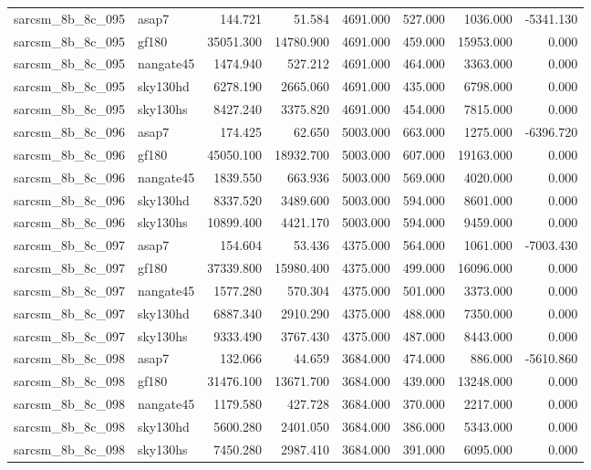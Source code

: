 \begin{tabular}{llrrrrrr}
sarcsm\_8b\_8c\_095 & asap7 & 144.721 & 51.584 & 4691.000 & 527.000 & 1036.000 & -5341.130 \\
sarcsm\_8b\_8c\_095 & gf180 & 35051.300 & 14780.900 & 4691.000 & 459.000 & 15953.000 & 0.000 \\
sarcsm\_8b\_8c\_095 & nangate45 & 1474.940 & 527.212 & 4691.000 & 464.000 & 3363.000 & 0.000 \\
sarcsm\_8b\_8c\_095 & sky130hd & 6278.190 & 2665.060 & 4691.000 & 435.000 & 6798.000 & 0.000 \\
sarcsm\_8b\_8c\_095 & sky130hs & 8427.240 & 3375.820 & 4691.000 & 454.000 & 7815.000 & 0.000 \\
sarcsm\_8b\_8c\_096 & asap7 & 174.425 & 62.650 & 5003.000 & 663.000 & 1275.000 & -6396.720 \\
sarcsm\_8b\_8c\_096 & gf180 & 45050.100 & 18932.700 & 5003.000 & 607.000 & 19163.000 & 0.000 \\
sarcsm\_8b\_8c\_096 & nangate45 & 1839.550 & 663.936 & 5003.000 & 569.000 & 4020.000 & 0.000 \\
sarcsm\_8b\_8c\_096 & sky130hd & 8337.520 & 3489.600 & 5003.000 & 594.000 & 8601.000 & 0.000 \\
sarcsm\_8b\_8c\_096 & sky130hs & 10899.400 & 4421.170 & 5003.000 & 594.000 & 9459.000 & 0.000 \\
sarcsm\_8b\_8c\_097 & asap7 & 154.604 & 53.436 & 4375.000 & 564.000 & 1061.000 & -7003.430 \\
sarcsm\_8b\_8c\_097 & gf180 & 37339.800 & 15980.400 & 4375.000 & 499.000 & 16096.000 & 0.000 \\
sarcsm\_8b\_8c\_097 & nangate45 & 1577.280 & 570.304 & 4375.000 & 501.000 & 3373.000 & 0.000 \\
sarcsm\_8b\_8c\_097 & sky130hd & 6887.340 & 2910.290 & 4375.000 & 488.000 & 7350.000 & 0.000 \\
sarcsm\_8b\_8c\_097 & sky130hs & 9333.490 & 3767.430 & 4375.000 & 487.000 & 8443.000 & 0.000 \\
sarcsm\_8b\_8c\_098 & asap7 & 132.066 & 44.659 & 3684.000 & 474.000 & 886.000 & -5610.860 \\
sarcsm\_8b\_8c\_098 & gf180 & 31476.100 & 13671.700 & 3684.000 & 439.000 & 13248.000 & 0.000 \\
sarcsm\_8b\_8c\_098 & nangate45 & 1179.580 & 427.728 & 3684.000 & 370.000 & 2217.000 & 0.000 \\
sarcsm\_8b\_8c\_098 & sky130hd & 5600.280 & 2401.050 & 3684.000 & 386.000 & 5343.000 & 0.000 \\
sarcsm\_8b\_8c\_098 & sky130hs & 7450.280 & 2987.410 & 3684.000 & 391.000 & 6095.000 & 0.000 \\

\end{tabular}
